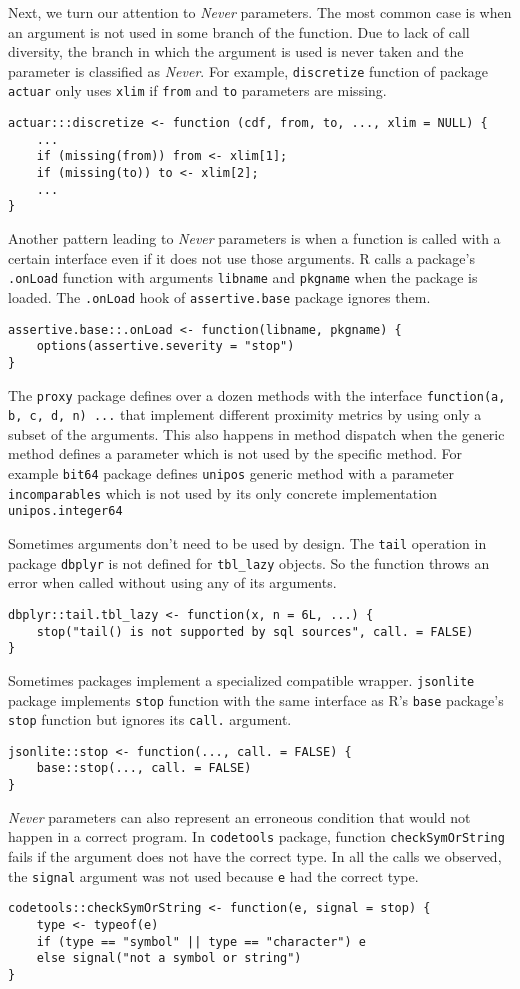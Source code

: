 \documentclass[review,nonacm,screen,acmsmall,anonymous=true]{acmart}
\newcommand{\never}{\emph{Never}\xspace}
\newcommand{\code}[1]{\lstinline |#1|\xspace}
\begin{document}
Next, we turn our attention to \never parameters.
%
The most common case is when an argument is not used in some branch of the
function. Due to lack of call diversity, the branch in which the argument is
used is never taken and the parameter is classified as \never. For example,
\code{discretize} function of package \code{actuar} only uses \code{xlim} if
\code{from} and \code{to} parameters are missing.
\begin{lstlisting}
actuar:::discretize <- function (cdf, from, to, ..., xlim = NULL) {
    ...
    if (missing(from)) from <- xlim[1];
    if (missing(to)) to <- xlim[2];
    ...
}
\end{lstlisting}
%
Another pattern leading to \never parameters is when a function is called with a
certain interface even if it does not use those arguments. R calls a package's
\code{.onLoad} function with arguments \code{libname} and \code{pkgname} when
the package is loaded. The \code{.onLoad} hook of \code{assertive.base} package
ignores them.
\begin{lstlisting}
assertive.base::.onLoad <- function(libname, pkgname) {
    options(assertive.severity = "stop")
}
\end{lstlisting}
%
The \code{proxy} package defines over a dozen methods with the interface
\code{function(a, b, c, d, n) ...} that implement different proximity metrics by
using only a subset of the arguments.
This also happens in method dispatch when the generic method defines a parameter
which is not used by the specific method. For example \code{bit64} package
defines \code{unipos} generic method with a parameter \code{incomparables} which
is not used by its only concrete implementation \code{unipos.integer64}

Sometimes arguments don't need to be used by design.
The \code{tail} operation in package \code{dbplyr} is not defined for
\code{tbl_lazy} objects. So the function throws an error when called without
using any of its arguments.
\begin{lstlisting}
dbplyr::tail.tbl_lazy <- function(x, n = 6L, ...) {
    stop("tail() is not supported by sql sources", call. = FALSE)
}
\end{lstlisting}
%
Sometimes packages implement a specialized compatible wrapper.
\code{jsonlite} package implements \code{stop} function with the same interface
as R's \code{base} package's \code{stop} function but ignores its \code{call.}
argument.
\begin{lstlisting}
jsonlite::stop <- function(..., call. = FALSE) {
    base::stop(..., call. = FALSE)
}
\end{lstlisting}
%
\never parameters can also represent an erroneous condition that would not
happen in a correct program. In \code{codetools} package, function
\code{checkSymOrString} fails if the argument does not have the correct type. In
all the calls we observed, the \code{signal} argument was not used because
\code{e} had the correct type.
\begin{lstlisting}
codetools::checkSymOrString <- function(e, signal = stop) {
    type <- typeof(e)
    if (type == "symbol" || type == "character") e
    else signal("not a symbol or string")
}
\end{lstlisting}
\end{document}
